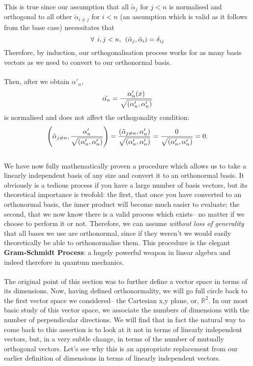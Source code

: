 This is true since our assumption that all $\tilde{\alpha}_{j}$ for $j<n$ is normalised and orthogonal to all other $\tilde{\alpha}_{i\neq j}$ for $i<n$ (an assumption which is valid as it follows from the base case) necessitates that 
$$
\forall\:\: i,j < n, \:\: \left(\tilde{\alpha}_{j},\tilde{\alpha}_{i}\right)= \delta_{ij}
$$
Therefore, by induction, our orthogonalisation process works for as many basis vectors as we need to convert to our orthonormal basis.
\\\\
Then, after we obtain $\alpha'_{n}$,
$$
\tilde{\alpha_{n}}=\frac{\alpha'_{n}(x)}{\sqrt{\left(\alpha'_{n},\alpha'_{n}\right)}}
$$
is normalised and does not affect the orthogonality condition:
$$
\left(\tilde{\alpha}_{j\neq n}, \frac{\alpha'_{n}}{\sqrt{\left(\alpha'_{n},\alpha'_{n}\right)}}\right)=\frac{\left(\tilde{\alpha}_{j\neq n},\alpha'_{n}\right)}{\sqrt{\left(\alpha'_{n},\alpha'_{n}\right)}}= \frac{0}{\sqrt{\left(\alpha'_{n},\alpha'_{n}\right)}}=0.
$$
\\
We have now fully mathematically proven a procedure which allows us to take a linearly independent basis of any size and convert it to an orthonormal basis. It obviously is a tedious process if you have a large number of basis vectors, but its theoretical importance is twofold: the first, that once you have converted to an orthonormal basis, the inner product will become much easier to evaluate; the second, that we now know there is a valid process which exists-- no matter if we choose to perform it or not. Therefore, we can assume \textit{without loss of generality} that all bases we use are orthonormal, since if they weren't we would easily theoretically be able to orthonormalise them. This procedure is the elegant \textbf{Gram-Schmidt Process}: a hugely powerful weapon in linear algebra and indeed therefore in quantum mechanics.
\\\\
The original point of this section was to further define a vector space in terms of its dimensions. Now, having defined orthonormality, we will go full circle back to the first vector space we considered-- the Cartesian x,y plane, or, $\mathbb{R}^2$. In our most basic study of this vector space, we associate the numbers of dimensions with the number of perpendicular directions. We will find that in fact the natural way to come back to this assertion is to look at it not in terms of linearly independent vectors, but, in a very subtle change, in terms of the number of mutually orthogonal vectors. Let's see why this is an appropriate replacement from our earlier definition of dimensions in terms of linearly independent vectors.
